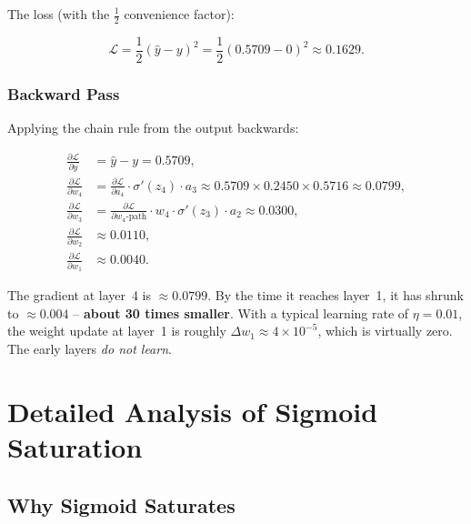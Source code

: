 \documentclass[12pt,a4paper]{article}
\newcommand{\sigmoid}{\sigma}
\newcommand{\Loss}{\mathcal{L}}
\begin{document}
The loss (with the $\frac{1}{2}$ convenience factor):

\begin{equation}
  \Loss = \frac{1}{2}(\hat{y} - y)^2
        = \frac{1}{2}(0.5709 - 0)^2 \approx 0.1629.
  \label{eq:loss_value}
\end{equation}

\subsubsection{Backward Pass}
\label{subsubsec:backward}

Applying the chain rule from the output backwards:

\begin{align}
  \frac{\partial \Loss}{\partial \hat{y}}
  &= \hat{y} - y = 0.5709, \label{eq:dl_dyhat}\\[6pt]
  \frac{\partial \Loss}{\partial w_4}
  &= \frac{\partial \Loss}{\partial a_4} \cdot \sigmoid'(z_4) \cdot a_3
   \approx 0.5709 \times 0.2450 \times 0.5716
   \approx 0.0799, \label{eq:grad_w4}\\[6pt]
  \frac{\partial \Loss}{\partial w_3}
  &= \frac{\partial \Loss}{\partial w_4\text{-path}} \cdot w_4 \cdot
     \sigmoid'(z_3) \cdot a_2 \approx 0.0300, \label{eq:grad_w3}\\[6pt]
  \frac{\partial \Loss}{\partial w_2}
  &\approx 0.0110, \label{eq:grad_w2}\\[6pt]
  \frac{\partial \Loss}{\partial w_1}
  &\approx 0.0040. \label{eq:grad_w1}
\end{align}

\begin{keyinsight}
The gradient at layer~4 is $\approx 0.0799$.  By the time it reaches
layer~1, it has shrunk to $\approx 0.004$ -- \textbf{about 30 times
smaller}.  With a typical learning rate of $\eta = 0.01$, the weight
update at layer~1 is roughly $\Delta w_1 \approx 4 \times 10^{-5}$,
which is virtually zero.  The early layers \emph{do not learn}.
\end{keyinsight}

\section{Detailed Analysis of Sigmoid Saturation}
\label{sec:sigmoid}

\subsection{Why Sigmoid Saturates}
\label{subsec:sigmoid_saturation}
\end{document}

